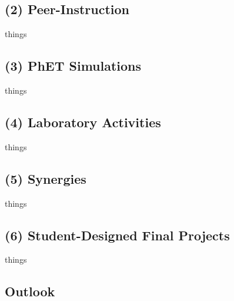 \documentclass[../../../main.tex]{subfiles}
\begin{document}
\subsection{(2) Peer-Instruction}
things
\subsection{(3) PhET Simulations}
things
\subsection{(4) Laboratory Activities}
things
\subsection{(5) Synergies}
things
\subsection{(6) Student-Designed Final Projects}
things
\subsection{Outlook}
\end{document}
